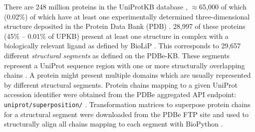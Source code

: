There are 248 million proteins in the UniProtKB database \cite{UNIPROT_2020_UNIPROT}, $\approx$65,000 of which (0.02\%) of which have at least one experimentally determined three-dimensional structure deposited in the Protein Data Bank (PDB) \cite{ARMSTRONG_2020_PDBE}. 28,997 of these proteins (45\% -- 0.01\% of UPKB) present at least one structure in complex with a biologically relevant ligand as defined by BioLiP \cite{YANG_2013_BIOLIP}. This corresponds to 29,657 different \textit{structural segments} as defined on the PDBe-KB. These segments represent a UniProt sequence region with one or more structurally overlapping chains  \cite{ELLAWAY_2024_CONFORMATIONS}. A protein might present multiple domains which are usually represented by different structural segments. Protein chains mapping to a given UniProt accession identifier were obtained from the PDBe aggregated API endpoint: \texttt{uniprot/superposition/} \cite{SUPP_ENDPOINT, PDBEKB_2019_PDBEKB}. Transformation matrices to superpose protein chains for a structural segment were downloaded from the PDBe FTP site \cite{SUPP_FTP_ENDPOINT, PDBE_2022_PDBEKB} and used to structurally align all chains mapping to each segment with BioPython \cite{COCK_2009_BIOPYTHON}.

